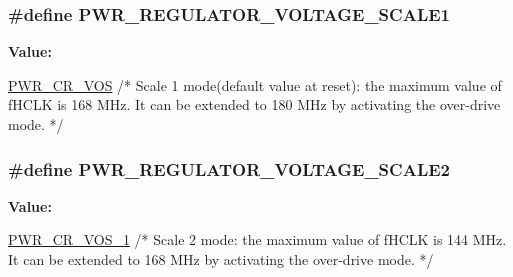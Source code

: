 \subsubsection[{\texorpdfstring{P\+W\+R\+\_\+\+R\+E\+G\+U\+L\+A\+T\+O\+R\+\_\+\+V\+O\+L\+T\+A\+G\+E\+\_\+\+S\+C\+A\+L\+E1}{PWR_REGULATOR_VOLTAGE_SCALE1}}]{\setlength{\rightskip}{0pt plus 5cm}\#define P\+W\+R\+\_\+\+R\+E\+G\+U\+L\+A\+T\+O\+R\+\_\+\+V\+O\+L\+T\+A\+G\+E\+\_\+\+S\+C\+A\+L\+E1}\hypertarget{group___p_w_r_ex___regulator___voltage___scale_ga3b5ca5ab9c19938a14d273825bcf840e}{}\label{group___p_w_r_ex___regulator___voltage___scale_ga3b5ca5ab9c19938a14d273825bcf840e}
{\bfseries Value\+:}
\begin{DoxyCode}
\hyperlink{group___peripheral___registers___bits___definition_gaccc33f1ba4e374e116ffa50f3a503030}{PWR\_CR\_VOS}             \textcolor{comment}{/* Scale 1 mode(default value at reset): the maximum value of fHCLK is 168
       MHz. It can be extended to}
\textcolor{comment}{                                                                       180 MHz by activating the over-drive
       mode. */}
\end{DoxyCode}
\subsubsection[{\texorpdfstring{P\+W\+R\+\_\+\+R\+E\+G\+U\+L\+A\+T\+O\+R\+\_\+\+V\+O\+L\+T\+A\+G\+E\+\_\+\+S\+C\+A\+L\+E2}{PWR_REGULATOR_VOLTAGE_SCALE2}}]{\setlength{\rightskip}{0pt plus 5cm}\#define P\+W\+R\+\_\+\+R\+E\+G\+U\+L\+A\+T\+O\+R\+\_\+\+V\+O\+L\+T\+A\+G\+E\+\_\+\+S\+C\+A\+L\+E2}\hypertarget{group___p_w_r_ex___regulator___voltage___scale_gaa0d38e304a0adfdbb58a61c96bdb95e9}{}\label{group___p_w_r_ex___regulator___voltage___scale_gaa0d38e304a0adfdbb58a61c96bdb95e9}
{\bfseries Value\+:}
\begin{DoxyCode}
\hyperlink{group___peripheral___registers___bits___definition_gac3093c26b256c965cebec3b2e388a3b4}{PWR\_CR\_VOS\_1}           \textcolor{comment}{/* Scale 2 mode: the maximum value of fHCLK is 144 MHz. It can be
       extended to}
\textcolor{comment}{                                                                       168 MHz by activating the over-drive
       mode. */}
\end{DoxyCode}
